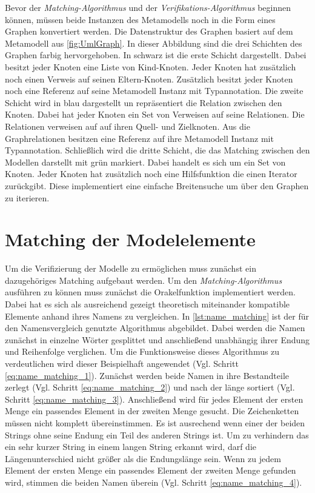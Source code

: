 Bevor der \emph{Matching-Algorithmus} und der \emph{Verifikations-Algorithmus} beginnen können, müssen beide Instanzen des Metamodells noch in die Form eines Graphen konvertiert werden.
Die Datenstruktur des Graphen basiert auf dem Metamodell aus \cref{fig:UmlGraph}.
In dieser Abbildung sind die drei Schichten des Graphen farbig hervorgehoben.
In schwarz ist die erste Schicht dargestellt.
Dabei besitzt jeder Knoten eine Liste von Kind-Knoten.
Jeder Knoten hat zusätzlich noch einen Verweis auf seinen Eltern-Knoten.
Zusätzlich besitzt jeder Knoten noch eine Referenz auf seine Metamodell Instanz mit Typannotation.
Die zweite Schicht wird in blau dargestellt un repräsentiert die Relation zwischen den Knoten.
Dabei hat jeder Knoten ein Set von Verweisen auf seine Relationen.
Die Relationen verweisen auf auf ihren Quell- und Zielknoten.
Aus die Graphrelationen besitzen eine Referenz auf ihre Metamodell Instanz mit Typannotation.
Schließlich wird die dritte Schicht, die das Matching zwischen den Modellen darstellt mit grün markiert.
Dabei handelt es sich um ein Set von Knoten.
Jeder Knoten hat zusätzlich noch eine Hilfsfunktion die einen Iterator zurückgibt.
Diese implementiert eine einfache Breitensuche um über den Graphen zu iterieren.

\section{Matching der Modelelemente}
\label{sec:matching_model_elements}

Um die Verifizierung der Modelle zu ermöglichen muss zunächst ein dazugehöriges Matching aufgebaut werden.
Um den \emph{Matching-Algorithmus} ausführen zu können muss zunächst die Orakelfunktion implementiert werden.
Dabei hat es sich als ausreichend gezeigt theoretisch miteinander kompatible Elemente anhand ihres Namens zu vergleichen.
In \cref{lst:name_matching} ist der für den Namensvergleich genutzte Algorithmus abgebildet.
Dabei werden die Namen zunächst in einzelne Wörter gesplittet und anschließend unabhängig ihrer Endung und Reihenfolge verglichen.
Um die Funktionsweise dieses Algorithmus zu verdeutlichen wird dieser Beispielhaft angewendet (Vgl. Schritt \ref{eq:name_matching_1}).
Zunächst werden beide Namen in ihre Bestandteile zerlegt (Vgl. Schritt \ref{eq:name_matching_2}) und nach der länge sortiert (Vgl. Schritt \ref{eq:name_matching_3}).
Anschließend wird für jedes Element der ersten Menge ein passendes Element in der zweiten Menge gesucht.
Die Zeichenketten müssen nicht komplett übereinstimmen.
Es ist ausrechend wenn einer der beiden Strings ohne seine Endung ein Teil des anderen Strings ist.
Um zu verhindern das ein sehr kurzer String in einem langen String erkannt wird, darf die Längenunterschied nicht größer als die Endungslänge sein.
Wenn zu jedem Element der ersten Menge ein passendes Element der zweiten Menge gefunden wird, stimmen die beiden Namen überein (Vgl. Schritt \ref{eq:name_matching_4}).

